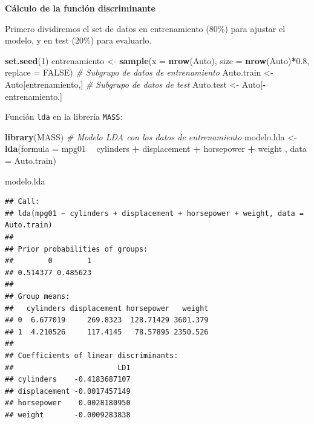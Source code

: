 \documentclass[]{book}
\newenvironment{Shaded}{\begin{snugshade}}{\end{snugshade}}
\newcommand{\KeywordTok}[1]{\textcolor[rgb]{0.13,0.29,0.53}{\textbf{#1}}}
\newcommand{\DataTypeTok}[1]{\textcolor[rgb]{0.13,0.29,0.53}{#1}}
\newcommand{\DecValTok}[1]{\textcolor[rgb]{0.00,0.00,0.81}{#1}}
\newcommand{\FloatTok}[1]{\textcolor[rgb]{0.00,0.00,0.81}{#1}}
\newcommand{\StringTok}[1]{\textcolor[rgb]{0.31,0.60,0.02}{#1}}
\newcommand{\CommentTok}[1]{\textcolor[rgb]{0.56,0.35,0.01}{\textit{#1}}}
\newcommand{\OtherTok}[1]{\textcolor[rgb]{0.56,0.35,0.01}{#1}}
\newcommand{\OperatorTok}[1]{\textcolor[rgb]{0.81,0.36,0.00}{\textbf{#1}}}
\newcommand{\NormalTok}[1]{#1}
\begin{document}
\textbf{Cálculo de la función discriminante}

Primero dividiremos el set de datos en entrenamiento (80\%) para ajustar
el modelo, y en test (20\%) para evaluarlo.

\begin{Shaded}
\begin{Highlighting}[]
\KeywordTok{set.seed}\NormalTok{(}\DecValTok{1}\NormalTok{)}
\NormalTok{entrenamiento <-}\StringTok{ }\KeywordTok{sample}\NormalTok{(}\DataTypeTok{x =} \KeywordTok{nrow}\NormalTok{(Auto), }\DataTypeTok{size =} \KeywordTok{nrow}\NormalTok{(Auto)}\OperatorTok{*}\FloatTok{0.8}\NormalTok{, }\DataTypeTok{replace =} \OtherTok{FALSE}\NormalTok{) }\CommentTok{# Subgrupo de datos de entrenamiento}
\NormalTok{Auto.train <-}\StringTok{ }\NormalTok{Auto[entrenamiento,]}
\CommentTok{# Subgrupo de datos de test}
\NormalTok{Auto.test <-}\StringTok{ }\NormalTok{Auto[}\OperatorTok{-}\NormalTok{entrenamiento,]}
\end{Highlighting}
\end{Shaded}

Función \texttt{lda} en la librería \texttt{MASS}:

\begin{Shaded}
\begin{Highlighting}[]
\KeywordTok{library}\NormalTok{(MASS)}
\CommentTok{# Modelo LDA con los datos de entrenamiento}
\NormalTok{modelo.lda <-}\StringTok{ }\KeywordTok{lda}\NormalTok{(}\DataTypeTok{formula =}\NormalTok{ mpg01 }\OperatorTok{~}\StringTok{ }\NormalTok{cylinders }\OperatorTok{+}\StringTok{ }\NormalTok{displacement }\OperatorTok{+}\StringTok{ }\NormalTok{horsepower }\OperatorTok{+}\StringTok{ }\NormalTok{weight , }\DataTypeTok{data =}\NormalTok{ Auto.train)}

\NormalTok{modelo.lda}
\end{Highlighting}
\end{Shaded}

\begin{verbatim}
## Call:
## lda(mpg01 ~ cylinders + displacement + horsepower + weight, data = Auto.train)
## 
## Prior probabilities of groups:
##        0        1 
## 0.514377 0.485623 
## 
## Group means:
##   cylinders displacement horsepower   weight
## 0  6.677019     269.8323  128.71429 3601.379
## 1  4.210526     117.4145   78.57895 2350.526
## 
## Coefficients of linear discriminants:
##                        LD1
## cylinders    -0.4183687107
## displacement -0.0017457149
## horsepower    0.0028180950
## weight       -0.0009283838
\end{verbatim}
\end{document}
